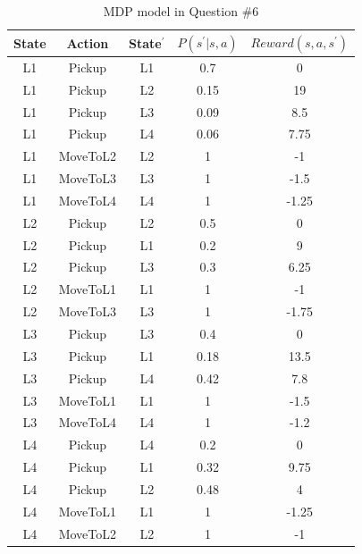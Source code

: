 \documentclass[conference]{styles/acmsiggraph}
\begin{document}
\begin{table}[!h]
	\centering
	\caption{MDP model in Question \#6}
	\label{tab:q6}
	\begin{tabular}{@{}ccccc@{}}
	\toprule
	State & Action   & State$^{\prime}$ & $P(s^{\prime}|s, a)$ & $Reward(s,a,s^{\prime})$ \\ \midrule
	L1    & Pickup   & L1     & 0.7       & 0              \\
	L1    & Pickup   & L2     & 0.15      & 19             \\
	L1    & Pickup   & L3     & 0.09     & 8.5           \\
	L1    & Pickup   & L4     & 0.06       & 7.75          \\
	L1    & MoveToL2 & L2     & 1         & -1             \\
	L1    & MoveToL3 & L3     & 1         & -1.5           \\
	L1    & MoveToL4 & L4     & 1         & -1.25          \\
	L2    & Pickup   & L2     & 0.5       & 0              \\
	L2    & Pickup   & L1     & 0.2      & 9          \\
	L2    & Pickup   & L3     & 0.3      & 6.25           \\
	L2    & MoveToL1 & L1     & 1         & -1             \\
	L2    & MoveToL3 & L3     & 1         & -1.75          \\
	L3    & Pickup   & L3     & 0.4       & 0              \\
	L3    & Pickup   & L1     & 0.18       & 13.5           \\
	L3    & Pickup   & L4     & 0.42       & 7.8            \\
	L3    & MoveToL1 & L1     & 1         & -1.5           \\
	L3    & MoveToL4 & L4     & 1         & -1.2           \\
	L4    & Pickup   & L4     & 0.2       & 0              \\
	L4    & Pickup   & L1     & 0.32       & 9.75           \\
	L4    & Pickup   & L2     & 0.48       & 4              \\
	L4    & MoveToL1 & L1     & 1         & -1.25          \\
	L4    & MoveToL2 & L2     & 1         & -1             \\ \bottomrule
	\end{tabular}
	\end{table}
\end{document}
